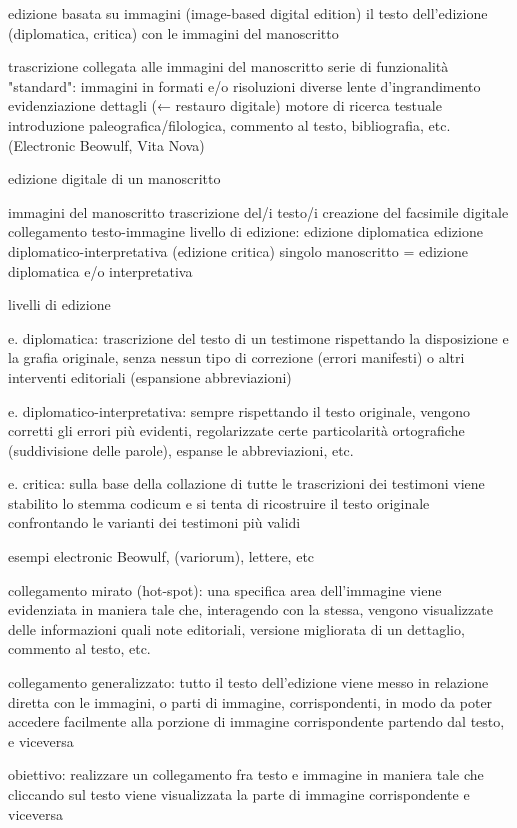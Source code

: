 edizione basata su immagini (image-based digital edition)
il testo dell’edizione (diplomatica, critica) con le immagini del
manoscritto

trascrizione collegata alle immagini del manoscritto
serie di funzionalità "standard":
immagini in formati e/o risoluzioni diverse 
lente d’ingrandimento
evidenziazione dettagli (← restauro digitale) 
motore di ricerca testuale
introduzione paleografica/filologica, 
commento al testo, bibliografia, etc.
(Electronic Beowulf, Vita Nova)

edizione digitale di un manoscritto

immagini del manoscritto trascrizione del/i testo/i creazione del facsimile digitale collegamento testo-immagine livello di edizione:
edizione diplomatica
edizione diplomatico-interpretativa (edizione critica)
singolo manoscritto = edizione diplomatica e/o interpretativa

livelli di edizione

e. diplomatica: trascrizione del testo di un testimone rispettando la disposizione e la grafia originale, senza nessun tipo di correzione (errori manifesti) o altri interventi editoriali (espansione abbreviazioni)

e. diplomatico-interpretativa: sempre rispettando il testo originale, vengono corretti gli errori più evidenti, regolarizzate certe particolarità ortografiche (suddivisione delle parole), espanse le abbreviazioni, etc.

e. critica: sulla base della collazione di tutte le trascrizioni
dei testimoni viene stabilito lo stemma codicum e si tenta
di ricostruire il testo originale confrontando le varianti dei
testimoni più validi

esempi electronic Beowulf, (variorum), lettere, etc

collegamento mirato (hot-spot): una specifica area dell’immagine viene evidenziata in maniera tale che, interagendo con la stessa, vengono visualizzate delle informazioni quali note editoriali, versione migliorata di un dettaglio, commento al testo, etc.

collegamento generalizzato: tutto il testo dell’edizione viene messo in relazione diretta con le immagini, o parti di immagine, corrispondenti, in modo da poter accedere facilmente alla porzione di immagine corrispondente partendo dal testo, e viceversa

obiettivo: realizzare un collegamento fra testo e immagine in maniera tale che cliccando sul testo viene visualizzata la parte di immagine corrispondente e viceversa

